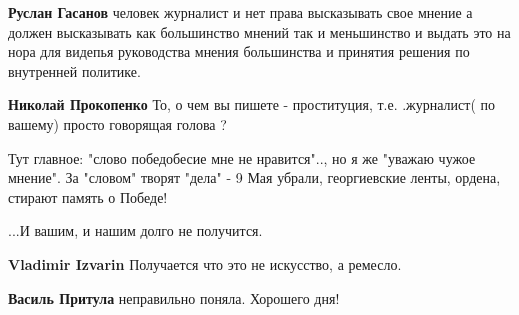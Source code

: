\begin{itemize}
\begin{itemize}
 
\textbf{Руслан Гасанов} человек журналист и нет права высказывать свое мнение а должен высказывать как большинство мнений так и меньшинство и выдать это на нора для видепья руководства мнения большинства и принятия решения по внутренней политике.

 
\textbf{Николай Прокопенко} То, о чем вы пишете - проституция, т.е. .журналист( по вашему) просто говорящая голова ?

 

Тут главное: "слово победобесие мне не нравится".., но я же "уважаю чужое
мнение". За "словом" творят "дела" - 9 Мая убрали, георгиевские ленты, ордена,
стирают память о Победе!

...И вашим, и нашим долго не получится.


 
\textbf{Vladimir Izvarin} Получается что это не искусство, а ремесло.

 
\textbf{Василь Притула} неправильно поняла. Хорошего дня! 🙏

 

\end{itemize}
\end{itemize}

